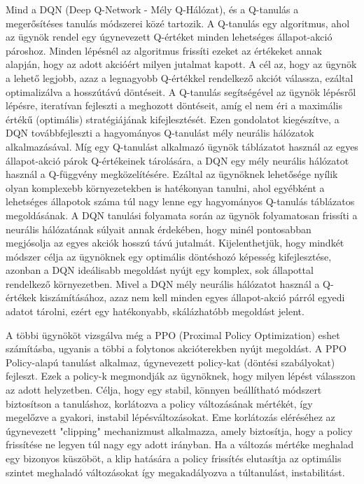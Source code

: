 \documentclass[
]{thesis-ekf}
\theoremstyle{definition}
\theoremstyle{remark}
\begin{document}
Mind a DQN (Deep Q-Network - Mély Q-Hálózat), és a Q-tanulás a megerősítéses tanulás módszerei közé tartozik. A Q-tanulás egy algoritmus, ahol az ügynök rendel egy úgynevezett Q-értéket minden lehetséges állapot-akció pároshoz. Minden lépésnél az algoritmus frissíti ezeket az értékeket annak alapján, hogy az adott akcióért milyen jutalmat kapott. A cél az, hogy az ügynök a lehető legjobb, azaz a legnagyobb Q-értékkel rendelkező akciót válassza, ezáltal optimalizálva a hosszútávú döntéseit. A Q-tanulás segítségével az ügynök lépésről lépésre, iteratívan fejleszti a meghozott döntéseit, amíg el nem éri a maximális értékű (optimális) stratégiájának kifejlesztését. Ezen gondolatot kiegészítve, a DQN továbbfejleszti a hagyományos Q-tanulást mély neurális hálózatok alkalmazásával. Míg egy Q-tanulást alkalmazó ügynök táblázatot használ az egyes állapot-akció párok Q-értékeinek tárolására, a DQN egy mély neurális hálózatot használ a Q-függvény megközelítésére. Ezáltal az ügynöknek lehetősége nyílik olyan komplexebb környezetekben is hatékonyan tanulni, ahol egyébként a lehetséges állapotok száma túl nagy lenne egy hagyományos Q-tanulás táblázatos megoldásának. A DQN tanulási folyamata során az ügynök folyamatosan frissíti a neurális hálózatának súlyait annak érdekében, hogy minél pontosabban megjósolja az egyes akciók hosszú távú jutalmát. Kijelenthetjük, hogy mindkét módszer célja az ügynöknek egy optimális döntéshozó képesség kifejlesztése, azonban a DQN ideálisabb megoldást nyújt egy komplex, sok állapottal rendelkező környezetben. Mivel a DQN mély neurális hálózatot használ a Q-értékek kiszámításához, azaz nem kell minden egyes állapot-akció párról egyedi adatot tárolni, ezért egy hatékonyabb, skálázhatóbb megoldást jelent.

A többi ügynököt vizsgálva még a PPO (Proximal Policy Optimization) eshet számításba, ugyanis a többi a folytonos akcióterekben nyújt megoldást. A PPO Policy-alapú tanulást alkalmaz, úgynevezett policy-kat (döntési szabályokat) fejleszt. Ezek a policy-k megmondják az ügynöknek, hogy milyen lépést válasszon az adott helyzetben. Célja, hogy egy stabil, könnyen beállítható módszert biztosítson a tanuláshoz, korlátozva a policy változásának mértékét, így megelőzve a gyakori, instabil lépésváltozásokat. Eme korlátozás eléréséhez az úgynevezett "clipping" mechanizmust alkalmazza, amely biztosítja, hogy a policy frissítése ne legyen túl nagy egy adott irányban. Ha a változás mértéke meghalad egy bizonyos küszöböt, a klip hatására a policy frissítés elutasítja az optimális szintet meghaladó változásokat így megakadályozva a túltanulást, instabilitást. \cite{PPO}
\end{document}
